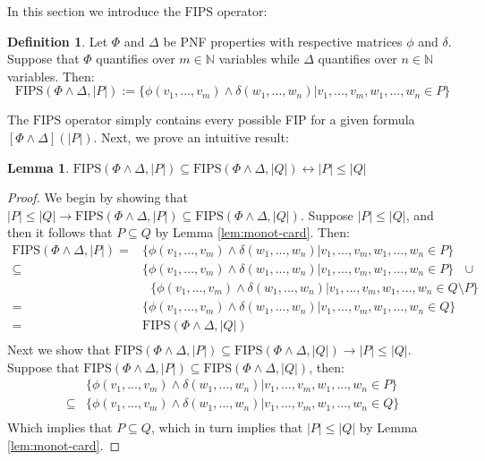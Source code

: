 \documentclass[12pt]{article}
\theoremstyle{definition}
\newtheorem{lemma}{Lemma}
\newtheorem{definition}{Definition}
\theoremstyle{remark}
\newcommand{\msp}{\text{ }}
\newcommand{\fips}{\text{FIPS}}
\begin{document}
In this section we introduce the $\fips$ operator:
\begin{definition}
  Let $\Phi$ and $\Delta$ be PNF properties with respective matrices $\phi$ and $\delta$.  Suppose that $\Phi$ quantifies over $m \in \mathbb{N}$ variables while $\Delta$ quantifies over $n \in \mathbb{N}$ variables.  Then:
  $$\fips(\Phi \land \Delta, |P|) := \{\phi(v_1,...,v_m) \land \delta(w_1,...,w_n) | v_1,...,v_m,w_1,...,w_n \in P\}$$
\end{definition}

The $\fips$ operator simply contains every possible FIP for a given formula $[\Phi\land\Delta](|P|)$.  Next, we prove an intuitive result:

\begin{lemma}
  \label{lem:fips-subset}
  $\fips(\Phi \land \Delta, |P|) \subseteq \fips(\Phi \land \Delta, |Q|) \leftrightarrow |P| \leq |Q|$
\end{lemma}
\begin{proof}
  We begin by showing that $|P| \leq |Q| \rightarrow \fips(\Phi \land \Delta, |P|) \subseteq \fips(\Phi \land \Delta, |Q|)$.  Suppose $|P| \leq |Q|$, and then it follows that $P \subseteq Q$ by Lemma \ref{lem:monot-card}.  Then:
  \begin{align*}
    \fips(\Phi \land \Delta, |P|) = &\{\phi(v_1,...,v_m) \land \delta(w_1,...,w_n) | v_1,...,v_m,w_1,...,w_n \in P\}\\
    \subseteq &\{\phi(v_1,...,v_m) \land \delta(w_1,...,w_n) | v_1,...,v_m,w_1,...,w_n \in P\} \msp \cup\\
              &\msp \{\phi(v_1,...,v_m) \land \delta(w_1,...,w_n) | v_1,...,v_m,w_1,...,w_n \in Q \setminus P\}\\
    = &\{\phi(v_1,...,v_m) \land \delta(w_1,...,w_n) | v_1,...,v_m,w_1,...,w_n \in Q\}\\
    = &\fips(\Phi \land \Delta, |Q|)\\
  \end{align*}
  Next we show that $\fips(\Phi \land \Delta, |P|) \subseteq \fips(\Phi \land \Delta, |Q|) \rightarrow |P| \leq |Q|$.  Suppose that $\fips(\Phi \land \Delta, |P|) \subseteq \fips(\Phi \land \Delta, |Q|)$, then:
  \begin{align*}
    &\{\phi(v_1,...,v_m) \land \delta(w_1,...,w_n) | v_1,...,v_m,w_1,...,w_n \in P\}\\
    \subseteq &\{\phi(v_1,...,v_m) \land \delta(w_1,...,w_n) | v_1,...,v_m,w_1,...,w_n \in Q\}\\
  \end{align*}
  Which implies that $P \subseteq Q$, which in turn implies that $|P| \leq |Q|$ by Lemma \ref{lem:monot-card}.
\end{proof}
\end{document}
